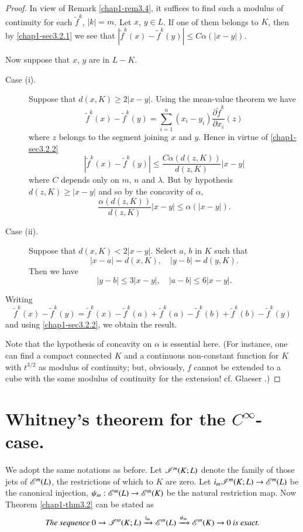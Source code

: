 \begin{proof}
In view of Remark \ref{chap1-rem3.4}, it suffices to find such a modulus of continuity for each $\widetilde{f}^{k}$, $|k|=m$. Let $x$, $y\in L$. If one of them belongs to $K$, then by \eqref{chap1-sec3.2.1} we see that $|\widetilde{f}^{k}(x)-\widetilde{f}^{k}(y)|\leq C\alpha (|x-y|)$.

Now suppose that $x$, $y$ are in $L-K$.
\begin{description}
\item[Case (i).] Suppose that $d(x,K)\geq 2|x-y|$. Using the mean-value theorem we have
$$
\widetilde{f}^{k}(x)-\widetilde{f}^{k}(y)=\sum\limits^{n}_{i=1}(x_{i}-y_{i})\dfrac{\partial \widetilde{f}^{k}}{\partial x_{i}}(z)
$$
where $z$ belongs to the segment joining $x$ and $y$. Hence in virtue of \eqref{chap1-sec3.2.2}
$$
|\widetilde{f}^{k}(x)-\widetilde{f}^{k}(y)|\leq \dfrac{C\alpha(d(z,K))}{d(z,K)}|x-y|
$$
where $C$ depends only on $m$, $n$ and $\lambda$. But by hypothesis $d(z,K)\geq |x-y|$ and so by the concavity of $\alpha$,
$$
\dfrac{\alpha(d(z,K))}{d(z,K)}|x-y|\leq \alpha(|x-y|).
$$

\item[Case (ii).] Suppose that $d(x,K)<2|x-y|$. Select $a$, $b$ in $K$ such that
$$
|x-a|=d(x,K),\quad |y-b|=d(y,K).
$$
Then we have
$$
|y-b|\leq 3|x-y|,\quad |a-b|\leq 6|x-y|.
$$\pageoriginale
\end{description}

Writing
$$
\widetilde{f}^{k}(x)-\widetilde{f}^{k}(y)=\widetilde{f}^{k}(x)-\widetilde{f}^{k}(a)+\widetilde{f}^{k}(a)-\widetilde{f}^{k}(b)+\widetilde{f}^{k}(b)-\widetilde{f}^{k}(y)
$$
and using \eqref{chap1-sec3.2.2}, we obtain the result.

Note that the hypothesis of concavity on $\alpha$ is essential here. (For instance, one can find a compact connected $K$ and a continuous non-constant function for $K$ with $t^{3/2}$ as modulus of continuity; but, obviously, $f$ cannot be extended to a cube with the same modulus of continuity for the extension! cf. Glaeser \cite{G. Glaeser: 1}.)
\end{proof}

\section[Whitney's theorem for the $C^{\infty}$-case]{Whitney's theorem for the \boldmath$C^{\infty}$-case.}\label{chap1-sec4}

We adopt the same notations as before. Let $\mathscr{I}^{m}(K;L)$ denote the family of those jets of $\mathscr{E}^{m}(L)$, the restrictions of which to $K$ are zero. Let $i_{m}\mathscr{I}^{m}(K;L)\to \mathscr{E}^{m}(L)$ be the canonical injection, $\psi_{m}:\mathscr{E}^{m}(L)\to \mathscr{E}^{m}(K)$ be the natural restriction map. Now Theorem \ref{chap1-thm3.2} can be stated as
$$
\text{\em The sequence } 0\to \mathscr{I}^{m}(K;L)\xrightarrow{i_{m}}\mathscr{E}^{m}(L)\xrightarrow{\psi_{m}}\mathscr{E}^{m}(K)\to 0\text{\em \ is exact.}
$$

